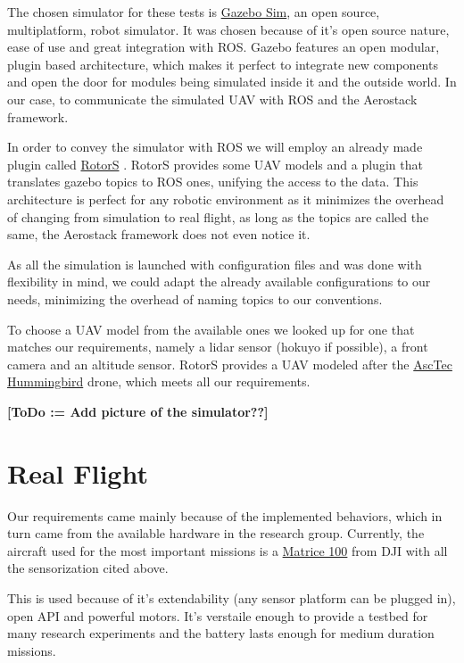   The chosen simulator for these tests is \href{http://gazebosim.org/}{Gazebo Sim}, an open source, multiplatform, robot simulator. It was chosen because of it's open source nature, ease of use and great integration with ROS. Gazebo features an open modular, plugin based architecture, which makes it perfect to integrate new components and open the door for modules being simulated inside it and the outside world. In our case, to communicate the simulated UAV with ROS and the Aerostack framework.

  In order to convey the simulator with ROS we will employ an already made plugin called \href{https://github.com/ethz-asl/rotors_simulator/wiki}{RotorS} \cite{rotors2016}. RotorS provides some UAV models and a plugin that translates gazebo topics to ROS ones, unifying the access to the data. This architecture is perfect for any robotic environment as it minimizes the overhead of changing from simulation to real flight, as long as the topics are called the same, the Aerostack framework does not even notice it.

  As all the simulation is launched with configuration files and was done with flexibility in mind, we could adapt the already available configurations to our needs, minimizing the overhead of naming topics to our conventions.

  To choose a UAV model from the available ones we looked up for one that matches our requirements, namely a lidar sensor (hokuyo if possible), a front camera and an altitude sensor. RotorS provides a UAV modeled after the \href{http://www.asctec.de/en/uav-uas-drones-rpas-roav/asctec-hummingbird/}{AscTec Hummingbird} drone, which meets all our requirements.

  \textbf{[ToDo := Add picture of the simulator??]}

\section{Real Flight} \label{ch_5:sect:real_flight}

  Our requirements came mainly because of the implemented behaviors, which in turn came from the available hardware in the research group. Currently, the aircraft used for the most important missions is a \href{https://www.dji.com/es/matrice100}{Matrice 100} from DJI with all the sensorization cited above.

  This is used because of it's extendability (any sensor platform can be plugged in), open API and powerful motors. It's verstaile enough to provide a testbed for many research experiments and the battery lasts enough for medium duration missions.

